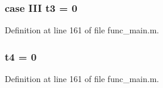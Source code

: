 \subsubsection[{t3}]{\setlength{\rightskip}{0pt plus 5cm}case I\-I\-I t3 = 0}\label{func__main_8m_a80d62394ff82e3ae283e9113bca340a2}


Definition at line 161 of file func\-\_\-main.\-m.

\subsubsection[{t4}]{\setlength{\rightskip}{0pt plus 5cm}t4 = 0}\label{func__main_8m_ae95ab11d59379638967673bd74654b2a}


Definition at line 161 of file func\-\_\-main.\-m.

